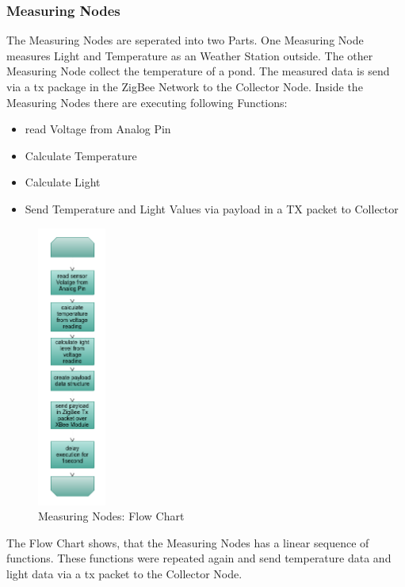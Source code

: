 \documentclass[
	11pt,
	a4paper
]{article}%
\begin{document}
\subsubsection{Measuring Nodes}
The Measuring Nodes are seperated into two Parts. One Measuring Node measures Light and Temperature as an Weather Station outside. The other Measuring Node collect the temperature of a pond. The measured data is send via a tx package in the ZigBee Network to the Collector Node. Inside the Measuring Nodes there are executing following Functions:
\begin{itemize}
\item read Voltage from Analog Pin
\item Calculate Temperature 
\item Calculate Light
\item Send Temperature and Light Values via payload in a TX packet to Collector
\end{itemize}
\begin{figure}[h!]
  \caption{Measuring Nodes: Flow Chart}
  \centering
    \includegraphics[width=0.20\textwidth]{../Images/Seq_Measuring.png}
\end{figure}
The Flow Chart shows, that the Measuring Nodes has a linear sequence of functions. These functions were repeated again and send temperature data and light data via a tx packet to the Collector Node.
\end{document}

